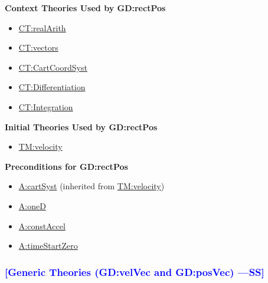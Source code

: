 \documentclass[12pt]{article}
\newcommand{\authornote}[3]{\textcolor{#1}{[#3 ---#2]}}
\newcommand{\authornote}[3]{}
\newcommand{\wss}[1]{\authornote{blue}{SS}{#1}}
\begin{document}
\noindent \textbf{Context Theories Used by GD:rectPos}

\begin{itemize}
\item \hyperref[CT:realArith]{CT:realArith}
\item \hyperref[CT:vectors]{CT:vectors}
\item \hyperref[CT:CartCoordSyst]{CT:CartCoordSyst}
\item \hyperref[CT:Differentiation]{CT:Differentiation}
\item \hyperref[CT:Integration]{CT:Integration}
\end{itemize}

\noindent \textbf{Initial Theories Used by GD:rectPos}

\begin{itemize}
\item \hyperref[TM:velocity]{TM:velocity}
\end{itemize}

\noindent \textbf{Preconditions for GD:rectPos}

\begin{itemize}
\item \hyperref[cartSyst]{A:cartSyst} (inherited from \hyperref[TM:velocity]{TM:velocity})
\item \hyperref[oneD]{A:oneD}
\item \hyperref[constAccel]{A:constAccel}
\item \hyperref[timeStartZero]{A:timeStartZero}
\end{itemize}

\subsubsection{\wss{Generic Theories (GD:velVec and GD:posVec)}}
\end{document}
